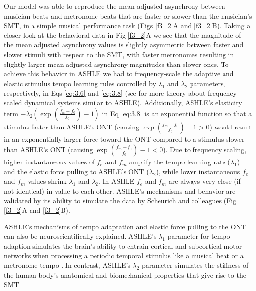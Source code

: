 \documentclass{report}
\begin{document}
Our model was able to reproduce the mean adjusted asynchrony between musician beats and metronome beats that are faster or slower than the musician's SMT, in a simple musical performance task (Figs \ref{f3_2}A and \ref{f3_2}B). Taking a closer look at the behavioral data in Fig \ref{f3_2}A we see that the magnitude of the mean adjusted asynchrony values is slightly asymmetric between faster and slower stimuli with respect to the SMT, with faster metronomes resulting in slightly larger mean adjusted asynchrony magnitudes than slower ones. To achieve this behavior in ASHLE we had to frequency-scale the adaptive and elastic stimulus tempo learning rules controlled by $\lambda_1$ and $\lambda_2$ parameters, respectively, in Eqs \eqref{eq:3.6} and \eqref{eq:3.8} (see \cite{kim2015signal, large2010canonical} for more theory about frequency-scaled dynamical systems similar to ASHLE). Additionally, ASHLE's elasticity term $-\lambda_2\left(\exp\left(\frac{f_m-f_0}{f_0}\right)-1\right)$ in Eq \eqref{eq:3.8} is an exponential function so that a stimulus faster than ASHLE's ONT (causing $\exp\left(\frac{f_m-f_0}{f_0}\right)-1>0$) would result in an exponentially larger force toward the ONT compared to a stimulus slower than ASHLE's ONT (causing $\exp\left(\frac{f_m-f_0}{f_0}\right)-1<0$). Due to frequency scaling, higher instantaneous values of $f_e$ and $f_m$ amplify the tempo learning rate ($\lambda_1$) and the elastic force pulling to ASHLE's ONT ($\lambda_2$), while lower instantaneous $f_e$ and $f_m$ values shrink $\lambda_1$ and $\lambda_2$. In ASHLE $f_e$ and $f_m$ are always very close (if not identical) in value to each other. ASHLE's mechanisms and behavior are validated by its ability to simulate the data by Scheurich and colleagues \cite{scheurich2018tapping} (Fig \ref{f3_2}A and \ref{f3_2}B).

ASHLE's mechanisms of tempo adaptation and elastic force pulling to the ONT can also be neuroscientifically explained. ASHLE's $\lambda_1$ parameter for tempo adaption simulates the brain's ability to entrain cortical and subcortical motor networks when processing a periodic temporal stimulus like a musical beat or a metronome tempo \cite{large2015neural}. In contrast, ASHLE's $\lambda_2$ parameter simulates the stiffness of the human body's anatomical and biomechanical properties that give rise to the SMT \cite{goodman2000advantages}
\end{document}
